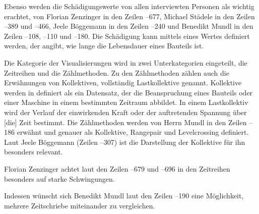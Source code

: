 Ebenso werden die Schädigungswerte von allen interviewten Personen als wichtig erachtet, von Florian Zenzinger in den Zeilen --677, Michael Städele in den Zeilen --389 und --466, Jeele Böggemann in den Zeilen --240 und Benedikt Mundl in den Zeilen --108, --110 und --180. Die Schädigung kann mittels eines Wertes definiert werden, der angibt, wie lange die Lebensdauer eines Bauteils ist.

Die Kategorie der Visualisierungen wird in zwei Unterkategorien eingeteilt, die Zeitreihen und die Zählmethoden. Zu den Zählmethoden zählen auch die Erwähnungen von \glqq Kollektiven\grqq{}, vollständig Lastkollektive genannt. Kollektive werden in \cite{Jacobs.2016} definiert als \glqq ein Datensatz, der die Beanspruchung eines Bauteils oder einer Maschine in einem bestimmten Zeitraum abbildet. In einem Lastkollektiv wird der Verlauf der einwirkenden Kraft oder der auftretenden Spannung über [die] Zeit bestimmt\grqq{}. Die Zählmethoden werden von Herrn Mundl in den Zeilen --186 erwähnt und genauer als Kollektive, Rangepair und Levelcrossing definiert. Laut Jeele Böggemann (Zeilen --307) ist die Darstellung der Kollektive für ihn besonders relevant.

Florian Zenzinger achtet laut den Zeilen --679 und --696 in den Zeitreihen besonders auf starke Schwingungen. 

Indessen wünscht sich Benedikt Mundl laut den Zeilen --190 eine Möglichkeit, mehrere Zeitschriebe miteinander zu vergleichen.

